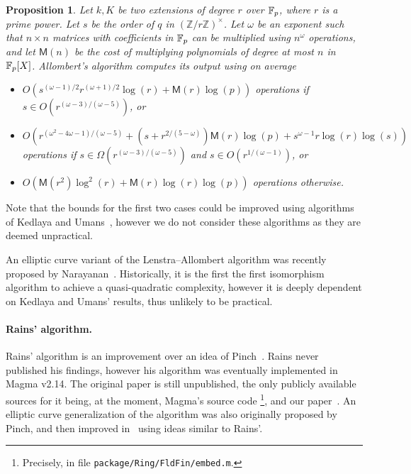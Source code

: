 \documentclass{report}
\theoremstyle{plain}
\newtheorem{proposition}[theorem]{Proposition}
\theoremstyle{definition}
\begin{document}
\begin{proposition}
  \def\MM{\mathsf{M}} %
  Let $k,K$ be two extensions of degree $r$ over $\mathbb{F}_p$, where $r$ is
  a prime power. %
  Let $s$ be the order of $q$ in $(ℤ/rℤ)^×$. %
  Let $ω$ be an exponent such that $n×n$ matrices with coefficients in
  $\mathbb{F}_p$ can be multiplied using $n^ω$ operations, and let $\MM(n)$ be
  the cost of multiplying polynomials of degree at most $n$ in
  $\mathbb{F}_p[X]$. %
  Allombert's algorithm computes its output using on average
  \begin{itemize}
  \item $O(s^{(\omega-1)/2}r^{(\omega+1)/2}\log(r)+\MM(r)\log(p))$
    operations if $s \in O(r^{(\omega-3)/(\omega-5)})$, or
   \item
     $O(
     r^{(\omega^2-4\omega-1)/(\omega-5)}+(s+r^{2/(5-\omega)})\MM(r)\log(p)
     +s^{\omega-1}r\log(r)\log(s))$ operations if
     $s \in \Omega(r^{(\omega-3)/(\omega-5)})$ and
     $s \in O(r^{1/(\omega-1)})$, or
  \item $O(\MM(r^2)\log^2(r) + \MM(r)\log(r)\log(p))$ operations
    otherwise.
  \end{itemize}
\end{proposition}

Note that the bounds for the first two cases could be improved using
algorithms of Kedlaya and Umans~\cite{KeUm11}, however we do not
consider these algorithms as they are deemed unpractical.

An elliptic curve variant of the Lenstra--Allombert algorithm was
recently proposed by Narayanan~\cite{narayanan2016fast}. %
Historically, it is the first the first isomorphism algorithm to
achieve a quasi-quadratic complexity, however it is deeply dependent
on Kedlaya and Umans' results, thus unlikely to be practical. %


\paragraph{Rains' algorithm.}
Rains' algorithm is an improvement over an idea of
Pinch~\cite{Pinch}. %
Rains never published his findings, however his algorithm was
eventually implemented in Magma v2.14. %
The original paper is still unpublished, the only publicly available
sources for it being, at the moment, Magma's source code%
\footnote{Precisely, in file \texttt{package/Ring/FldFin/embed.m}.}, %
and our paper~\cite{brieulle2018computing}. %
An elliptic curve generalization of the algorithm was also originally
proposed by Pinch, and then improved in~\cite{brieulle2018computing}
using ideas similar to Rains'. %
\end{document}
